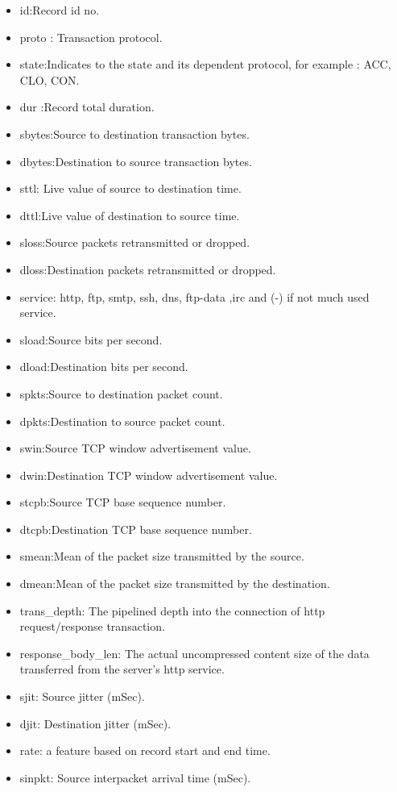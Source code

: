 \documentclass[14pt, conference]{IEEEtran}
\begin{document}
\begin{itemize}
\item  id:Record id no.
\item proto : Transaction protocol.
\item state:Indicates to the state and its dependent protocol, for example : ACC, CLO, CON.
\item dur :Record total duration.
\item sbytes:Source to destination transaction bytes.
\item dbytes:Destination to source transaction bytes.
\item sttl: Live value of source to destination time.
\item dttl:Live value of destination to source time.
\item sloss:Source packets retransmitted or dropped.
\item dloss:Destination packets retransmitted or dropped.
\item service: http, ftp, smtp, ssh, dns, ftp-data ,irc  and (-) if not much used service.
\item sload:Source bits per second.
\item dload:Destination bits per second.
\item spkts:Source to destination packet count.
\item dpkts:Destination to source packet count.
\item swin:Source TCP window advertisement value.
\item dwin:Destination TCP window advertisement value.
\item stcpb:Source TCP base sequence number.
\item dtcpb:Destination TCP base sequence number.
\item smean:Mean of the packet size transmitted by the source.
\item dmean:Mean of the packet size transmitted by the destination.
\item trans\_depth: The pipelined depth into the connection of http request/response transaction.
\item response\_body\_len: The actual uncompressed content size of the data transferred from the server’s http service.
\item sjit: Source jitter (mSec).
\item djit: Destination jitter (mSec).
\item rate: a feature based on record start and end time.
\item sinpkt: Source interpacket arrival time (mSec).

\end{itemize}
\end{document}
